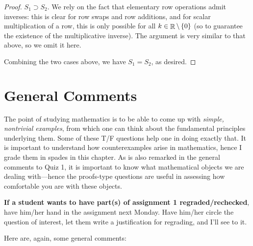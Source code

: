 \documentclass{amsart}
\theoremstyle{definition}
\theoremstyle{definition}
\DeclareMathOperator{\R}{\mathbb{R}}
\DeclareMathOperator{\1}{\mathbbm{1}}
\begin{document}
\begin{enumerate}[itemsep = 2mm]
\begin{proof}
		\uline{$S_1 \supset S_2$}. We rely on the fact that elementary row operations admit inverses: this is clear for row swaps and row additions, and for scalar multiplication of a row, this is only possible for all $k \in \R \setminus \set{0}$ (so to guarantee the existence of the multiplicative inverse). The argument is very similar to that above, so we omit it here.

		Combining the two cases above, we have $S_1 = S_2$, as desired.
	\end{proof}
	
	
\end{enumerate}


\clearpage


\section*{General Comments}

The point of studying mathematics is to be able to come up with \textit{simple, nontrivial examples}, from which one can think about the fundamental principles underlying them. Some of these T/F questions help one in doing exactly that. It is important to understand how counterexamples arise in mathematics, hence I grade them in spades in this chapter. As is also remarked in the general comments to Quiz 1, it is important to know what mathematical objects we are dealing with---hence the proofs-type questions are useful in assessing how comfortable you are with these objects.

\textbf{If a student wants to have part(s) of assignment 1 regraded/rechecked}, have him/her hand in the assignment next Monday. Have him/her circle the question of interest, let them write a justification for regrading, and I'll see to it.

Here are, again, some general comments:
\end{document}
